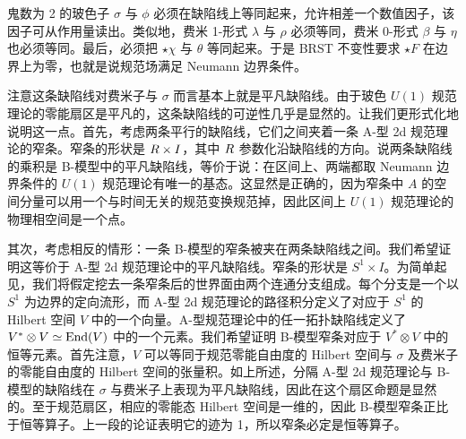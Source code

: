 鬼数为 2 的玻色子 $\sigma$ 与 $\phi$ 必须在缺陷线上等同起来，允许相差一个数值因子，该因子可从作用量读出。类似地，费米 1-形式 $\lambda$ 与 $\rho$ 必须等同，费米 0-形式 $\beta$ 与 $\eta$ 也必须等同。最后，必须把 $\star\chi$ 与 $\theta$ 等同起来。于是 BRST 不变性要求 $\star F$ 在边界上为零，也就是说规范场满足 Neumann 边界条件。

注意这条缺陷线对费米子与 $\sigma$ 而言基本上就是平凡缺陷线。由于玻色 $U(1)$ 规范理论的零能扇区是平凡的，这条缺陷线的可逆性几乎是显然的。让我们更形式化地说明这一点。首先，考虑两条平行的缺陷线，它们之间夹着一条 A-型 2d 规范理论的窄条。窄条的形状是 $R\times I$，其中 $R$
参数化沿缺陷线的方向。说两条缺陷线的乘积是 B-模型中的平凡缺陷线，等价于说：在区间上、两端都取 Neumann 边界条件的 $U(1)$ 规范理论有唯一的基态。这显然是正确的，因为窄条中 $A$ 的空间分量可以用一个与时间无关的规范变换规范掉，因此区间上 $U(1)$ 规范理论的物理相空间是一个点。


其次，考虑相反的情形：一条 B-模型的窄条被夹在两条缺陷线之间。我们希望证明这等价于 A-型 2d 规范理论中的平凡缺陷线。窄条的形状是 $S^1\times I$。为简单起见，我们将假定挖去一条窄条后的世界面由两个连通分支组成。每个分支是一个以 $S^1$ 为边界的定向流形，而 A-型 2d 规范理论的路径积分定义了对应于 $S^1$ 的 Hilbert 空间 $V$ 中的一个向量。A-型规范理论中的任一拓扑缺陷线定义了 $V^*\otimes V\simeq\operatorname{End}(V)$ 中的一个元素。我们希望证明 B-模型窄条对应于 $V^*\otimes V$ 中的恒等元素。首先注意，$V$ 可以等同于规范零能自由度的 Hilbert 空间与 $\sigma$ 及费米子的零能自由度的 Hilbert 空间的张量积。如上所述，分隔 A-型 2d 规范理论与 B-模型的缺陷线在 $\sigma$ 与费米子上表现为平凡缺陷线，因此在这个扇区命题是显然的。至于规范扇区，相应的零能态 Hilbert 空间是一维的，因此 B-模型窄条正比于恒等算子。上一段的论证表明它的迹为 1，所以窄条必定是恒等算子。


